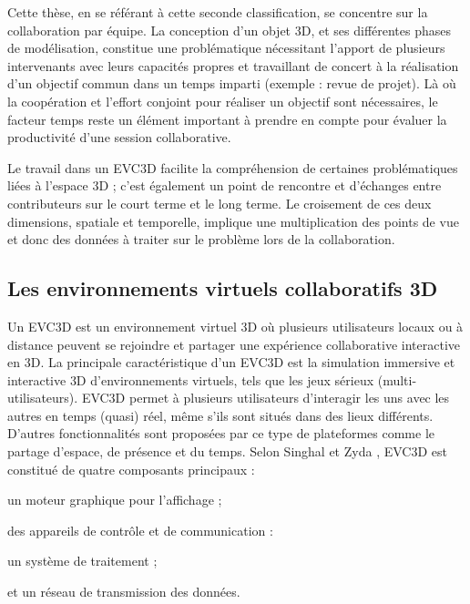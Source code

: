 Cette thèse, en se référant à cette seconde classification, se concentre sur la 
collaboration par équipe. La conception d'un objet \gls{3D}, et ses différentes 
phases de modélisation, constitue une problématique nécessitant l'apport de 
plusieurs intervenants avec leurs capacités propres et travaillant de concert à la 
réalisation d'un objectif commun dans un temps imparti (exemple : revue de 
projet). Là où la coopération et l'effort conjoint pour réaliser un objectif sont 
nécessaires, le facteur temps reste un élément important à prendre en compte 
pour évaluer la productivité d'une session collaborative.

Le travail dans un \gls{EVC3D} facilite la compréhension 
de certaines problématiques liées à l'espace \gls{3D} ; c'est également un point de 
rencontre et d'échanges entre contributeurs sur le court terme et le long terme. 
Le croisement de ces deux dimensions, spatiale et temporelle, implique une 
multiplication des points de vue et donc des données à traiter sur le problème lors 
de la collaboration.


\subsection{Les environnements virtuels collaboratifs 3D}

Un \gls{EVC3D} est un environnement virtuel \gls{3D} où plusieurs utilisateurs 
locaux 
ou à distance peuvent se rejoindre et partager une expérience collaborative 
interactive en \gls{3D}. La principale caractéristique d'un \gls{EVC3D} est la 
simulation 
immersive et interactive \gls{3D} d'environnements virtuels, tels que les jeux 
sérieux (multi-utilisateurs). \gls{EVC3D} permet à plusieurs utilisateurs d'interagir les uns avec 
les autres en temps (quasi) réel, même s'ils sont situés dans des lieux différents. 
D'autres fonctionnalités sont proposées par ce type de plateformes comme le 
partage d'espace, de présence et du temps. Selon Singhal et Zyda 
\cite{Singhal1999}, \gls{EVC3D} est constitué de quatre composants principaux :
\begin{enumerate*}[label=(\roman*)]
	\item un moteur graphique pour l'affichage ;
	\item des appareils de contrôle et de communication :
	\item un système de traitement ;
	\item et un réseau de transmission des données. 
\end{enumerate*}


